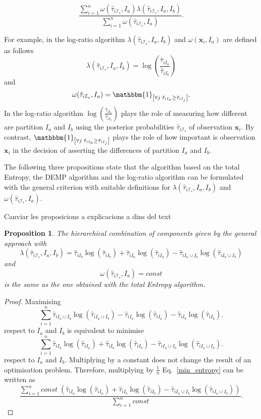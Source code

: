 \documentclass[10pt, a4paper]{article}
\newtheorem{prop}{Proposition}
\newcommand{\m}[1]{\boldsymbol{#1}}
\begin{document}
\begin{equation}\label{unifying_equation}
\frac{\sum_{i=1}^n \omega(\hat{\tau}_{i \mathcal{I}_s}, I_a) \lambda(\hat{\tau}_{i \mathcal{I}_s}, I_a, I_b)}{\sum_{i=1}^n \omega(\hat{\tau}_{i \mathcal{I}_s}, I_a) }.
\end{equation}

For example, in the log-ratio algorithm $\lambda(\hat{\tau}_{i \mathcal{I}_s}, I_a, I_b)$ and $\omega(\m x_i, I_a)$ are defined as follows
\[
\lambda(\hat{\tau}_{i \mathcal{I}_s}, I_a, I_b) = \log( \frac{ \hat{\tau}_{iI_a} }{ \hat{\tau}_{iI_b} })
\]
and
\[
\omega(\hat{\tau}_{i \mathcal{I}_s}, I_a) = \mathbbm{1}_{\left[ \forall j\; \hat{\tau}_{i I_{a}} \geq \hat{\tau}_{iI_j} \right]}.
\]
In the log-ratio algorithm $\log( \frac{ \hat{\tau}_{iI_a} }{ \hat{\tau}_{iI_b} })$ plays the role of measuring how different are partition $I_a$ and $I_b$ using the posterior probabilities $\hat{\tau}_{i \mathcal{I}_s}$ of observation $\m x_i$. By contrast, $\mathbbm{1}_{\left[ \forall j\; \hat{\tau}_{i I_{a}} \geq \hat{\tau}_{iI_j} \right]}$ plays the role of how important is observation $\m x_i$ in the decision of asserting the differences of partition $I_a$ and $I_b$.

The following three propositions state that the algorithm based on the total Entropy, the DEMP algorithm and the log-ratio algorithm can be formulated with the general criterion with suitable definitions for $\lambda(\hat{\tau}_{i \mathcal{I}_s}, I_a, I_b)$ and $\omega(\hat{\tau}_{i \mathcal{I}_s}, I_a)$.

{\color{red} Canviar les proposicions a explicacions a dins del text}
\begin{prop}
The hierarchical combination of components given by the general approach with
\[
\lambda(\hat{\tau}_{i \mathcal{I}_s}, I_a, I_b) = \hat{\tau}_{iI_b} \log(\hat{\tau}_{iI_b}) + \hat{\tau}_{iI_a} \log(\hat{\tau}_{iI_a}) - \hat{\tau}_{i I_a \cup I_b} \log(\hat{\tau}_{i I_a \cup I_b})
\]
and
\[
\omega(\hat{\tau}_{i \mathcal{I}_s}, I_a) = const
\]
is the same as the one obtained with the total Entropy algorithm.
\end{prop}
\begin{proof}
Maximising
\[
\sum_{i=1}^n \hat{\tau}_{i I_a \cup I_b} \log(\hat{\tau}_{i I_a \cup I_b}) - \hat{\tau}_{iI_a} \log(\hat{\tau}_{iI_a}) - \hat{\tau}_{iI_b} \log(\hat{\tau}_{iI_b}).
\]
respect to $I_a$ and $I_b$ is equivalent to minimise
\begin{equation}\label{min_entropy}
\sum_{i=1}^n \hat{\tau}_{iI_a} \log(\hat{\tau}_{iI_a}) + \hat{\tau}_{iI_b} \log(\hat{\tau}_{iI_b}) - \hat{\tau}_{i I_a \cup I_b} \log(\hat{\tau}_{i I_a \cup I_b}).
\end{equation}
respect to $I_a$ and $I_b$. Multiplying by a constant does not change the result of an optimisation problem. Therefore, multiplying by $\frac{1}{n}$ Eq.~\ref{min_entropy} can be written as
\[
\frac{\sum_{i=1}^n const \; ( \hat{\tau}_{iI_a} \log(\hat{\tau}_{iI_a}) + \hat{\tau}_{iI_b} \log(\hat{\tau}_{iI_b}) - \hat{\tau}_{i I_a \cup I_b} \log(\hat{\tau}_{i I_a \cup I_b}) )}{\sum_{i=1}^n const}.
\]
\end{proof}
\end{document}
